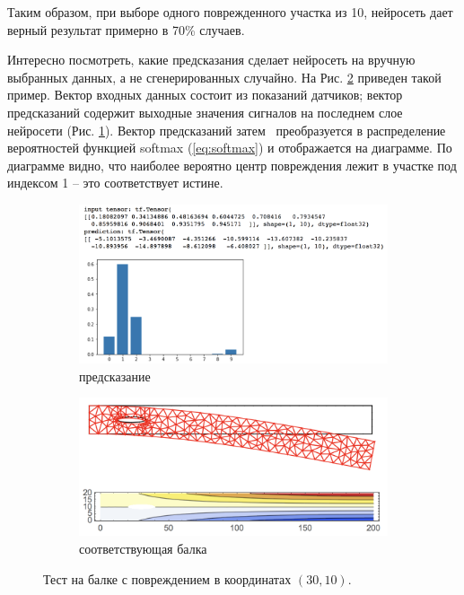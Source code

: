 \documentclass[a4paper,12pt]{article}
\theoremstyle{remark}
\begin{document}
	Таким образом, при выборе одного поврежденного участка из 10, нейросеть дает верный результат примерно в 70\% случаев.
	
	Интересно посмотреть, какие предсказания сделает нейросеть на вручную выбранных данных, а не сгенерированных случайно. На Рис. \ref{fig:nn1_damage_30_10} приведен такой пример. Вектор входных данных состоит из показаний датчиков; вектор предсказаний содержит выходные значения сигналов на последнем слое нейросети (Рис. \ref{fig:nn1_damage_30_10_a}). Вектор предсказаний затем  преобразуется в распределение вероятностей функцией softmax (\ref{eq:softmax}) и отображается на диаграмме. По диаграмме видно, что наиболее вероятно центр повреждения лежит в участке под индексом 1 -- это соответствует истине.
	\begin{figure}[h]
		\begin{subfigure}[t]{0.6\textwidth}
			\includegraphics[width=\linewidth]{nn1_damage_30_10.png}
			\caption{предсказание}
			\label{fig:nn1_damage_30_10_a}
		\end{subfigure}
		\begin{subfigure}[t]{0.4\textwidth}
			\includegraphics[width=\linewidth]{ds1_damage_30_10.png}
			\caption{соответствующая балка}
		\end{subfigure}
		\caption{Тест на балке с повреждением в координатах $(30, 10)$.}
		\label{fig:nn1_damage_30_10}
	\end{figure}
\end{document}

